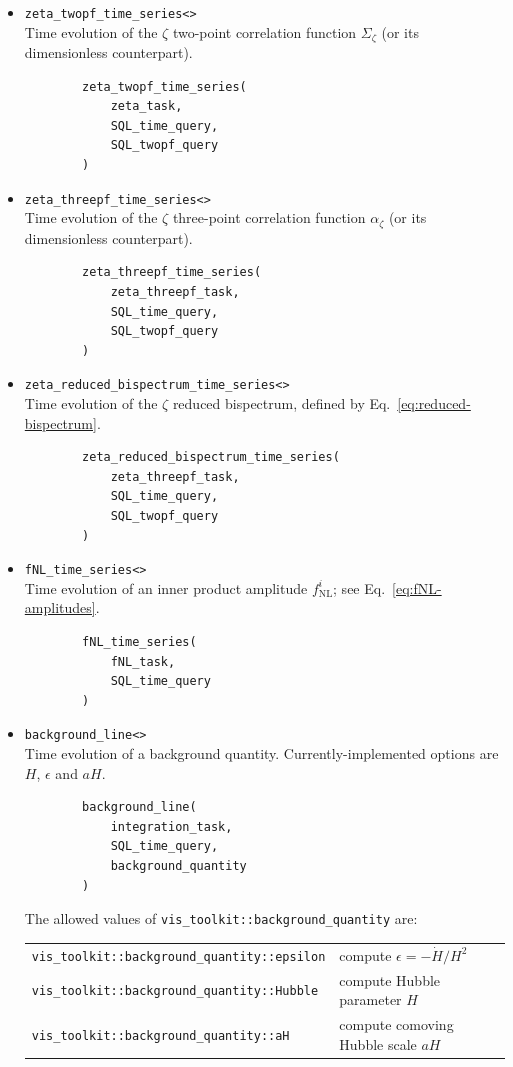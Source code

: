 \documentclass[11pt,a4paper]{article}
\newcommand{\fNL}{f_{\mathrm{NL}}}
\begin{document}
\begin{itemize}
    \item \texttt{zeta_twopf_time_series<>} \\
    Time evolution of the $\zeta$ two-point correlation function $\Sigma_\zeta$
    (or its dimensionless counterpart).
    \begin{verbatim}
        zeta_twopf_time_series(
            zeta_task,
            SQL_time_query,
            SQL_twopf_query
        )
    \end{verbatim}

    \item \texttt{zeta_threepf_time_series<>} \\
    Time evolution of the $\zeta$ three-point correlation function $\alpha_\zeta$
    (or its dimensionless counterpart).
    \begin{verbatim}
        zeta_threepf_time_series(    
            zeta_threepf_task,
            SQL_time_query,
            SQL_twopf_query
        )
    \end{verbatim}
    
    \item \texttt{zeta_reduced_bispectrum_time_series<>} \\
    Time evolution of the $\zeta$ reduced bispectrum, defined by
    Eq.~\eqref{eq:reduced-bispectrum}.
    \begin{verbatim}
        zeta_reduced_bispectrum_time_series(    
            zeta_threepf_task,
            SQL_time_query,
            SQL_twopf_query
        )
    \end{verbatim}
    
    \item \texttt{fNL_time_series<>} \\
    Time evolution of an inner product amplitude $\fNL^i$;
    see Eq.~\eqref{eq:fNL-amplitudes}.
    \begin{verbatim}
        fNL_time_series(
            fNL_task,
            SQL_time_query
        )    
    \end{verbatim}

    \item \texttt{background_line<>} \\
    Time evolution of a background quantity. Currently-implemented options are
    $H$, $\epsilon$ and $aH$.
    \begin{verbatim}
        background_line(
            integration_task,
            SQL_time_query,
            background_quantity
        )
    \end{verbatim}
    The allowed values of \texttt{vis_toolkit::background_quantity}
    are: \\
    \begin{tabular}{p{7cm}p{7.5cm}}
        \texttt{vis_toolkit::background_quantity::epsilon} &
            compute $\epsilon = - \dot{H}/H^2$ \\
        \texttt{vis_toolkit::background_quantity::Hubble} &
            compute Hubble parameter $H$ \\
        \texttt{vis_toolkit::background_quantity::aH} &
            compute comoving Hubble scale $aH$
    \end{tabular}
    

\end{itemize}
\end{document}
